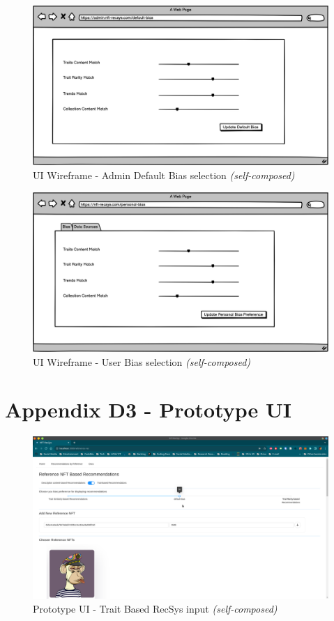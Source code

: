 \begin{figure}[h!]
\centering
\includegraphics[width=\textwidth]{images/appendix/UI Wireframes/Admin Default Bias selection.png}
\caption{UI Wireframe - Admin Default Bias selection \textit{(self-composed)}}
\end{figure}

\begin{figure}[h!]
\centering
\includegraphics[width=\textwidth]{images/appendix/UI Wireframes/User Bias selection.png}
\caption{UI Wireframe - User Bias selection \textit{(self-composed)}}
\end{figure}


\clearpage
\section*{Appendix D3 - Prototype UI}

\begin{figure}[h!]
\centering
\includegraphics[width=\textwidth]{images/appendix/Prototype/UI/Prototype UI 1.png}
\caption{Prototype UI - Trait Based RecSys input \textit{(self-composed)}}
\end{figure}

